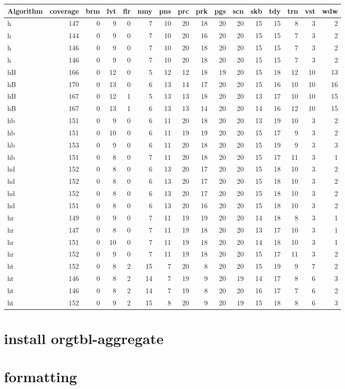 \begin{center}
\begin{tabular}{lrrrrrrrrrrrrrrr}
Algorithm & coverage & brm & lvt & flr & nmy & pns & prc & prk & pgs & scn & skb & tdy & trn & vst & wdw\\
\hline
h & 147 & 0 & 9 & 0 & 7 & 10 & 20 & 18 & 20 & 20 & 15 & 15 & 8 & 3 & 2\\
h & 144 & 0 & 9 & 0 & 7 & 10 & 20 & 16 & 20 & 20 & 15 & 15 & 7 & 3 & 2\\
h & 146 & 0 & 9 & 0 & 7 & 10 & 20 & 18 & 20 & 20 & 15 & 15 & 7 & 3 & 2\\
h & 146 & 0 & 9 & 0 & 7 & 10 & 20 & 18 & 20 & 20 & 15 & 15 & 7 & 3 & 2\\
hB & 166 & 0 & 12 & 0 & 5 & 12 & 12 & 18 & 19 & 20 & 15 & 18 & 12 & 10 & 13\\
hB & 170 & 0 & 13 & 0 & 6 & 13 & 14 & 17 & 20 & 20 & 15 & 16 & 10 & 10 & 16\\
hB & 167 & 0 & 12 & 1 & 5 & 13 & 13 & 18 & 20 & 20 & 13 & 17 & 10 & 10 & 15\\
hB & 167 & 0 & 13 & 1 & 6 & 13 & 13 & 14 & 20 & 20 & 14 & 16 & 12 & 10 & 15\\
hb & 151 & 0 & 9 & 0 & 6 & 11 & 20 & 18 & 20 & 20 & 13 & 19 & 10 & 3 & 2\\
hb & 151 & 0 & 10 & 0 & 6 & 11 & 19 & 19 & 20 & 20 & 15 & 17 & 9 & 3 & 2\\
hb & 153 & 0 & 9 & 0 & 6 & 11 & 20 & 18 & 20 & 20 & 15 & 19 & 9 & 3 & 3\\
hb & 151 & 0 & 8 & 0 & 7 & 11 & 20 & 18 & 20 & 20 & 15 & 17 & 11 & 3 & 1\\
hd & 152 & 0 & 8 & 0 & 6 & 13 & 20 & 17 & 20 & 20 & 15 & 18 & 10 & 3 & 2\\
hd & 152 & 0 & 8 & 0 & 6 & 13 & 20 & 17 & 20 & 20 & 15 & 18 & 10 & 3 & 2\\
hd & 152 & 0 & 8 & 0 & 6 & 13 & 20 & 17 & 20 & 20 & 15 & 18 & 10 & 3 & 2\\
hd & 151 & 0 & 8 & 0 & 6 & 13 & 20 & 16 & 20 & 20 & 15 & 18 & 10 & 3 & 2\\
hr & 149 & 0 & 9 & 0 & 7 & 11 & 19 & 19 & 20 & 20 & 14 & 18 & 8 & 3 & 1\\
hr & 147 & 0 & 8 & 0 & 7 & 11 & 19 & 18 & 20 & 20 & 13 & 17 & 10 & 3 & 1\\
hr & 151 & 0 & 10 & 0 & 7 & 11 & 19 & 18 & 20 & 20 & 14 & 18 & 10 & 3 & 1\\
hr & 152 & 0 & 9 & 0 & 7 & 11 & 19 & 18 & 20 & 20 & 15 & 17 & 11 & 3 & 2\\
ht & 152 & 0 & 8 & 2 & 15 & 7 & 20 & 8 & 20 & 20 & 15 & 19 & 9 & 7 & 2\\
ht & 146 & 0 & 8 & 2 & 14 & 7 & 19 & 9 & 20 & 19 & 14 & 17 & 8 & 6 & 3\\
ht & 146 & 0 & 8 & 2 & 14 & 7 & 19 & 8 & 20 & 20 & 16 & 17 & 7 & 6 & 2\\
ht & 152 & 0 & 9 & 2 & 15 & 8 & 20 & 9 & 20 & 19 & 15 & 18 & 8 & 6 & 3\\
\end{tabular}
\end{center}

\section{install orgtbl-aggregate}
\label{sec-1}

\section{formatting}
\label{sec-2}
